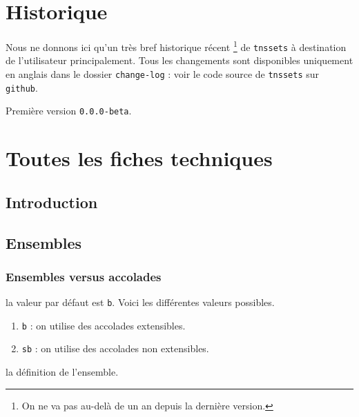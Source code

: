 \documentclass[12pt,a4paper]{article}
\theoremstyle{definition}
\begin{document}
\newpage

\section{Historique}

Nous ne donnons ici qu'un très bref historique récent
\footnote{
	On ne va pas au-delà de un an depuis la dernière version.
}
de \verb+tnssets+ à destination de l'utilisateur principalement.
Tous les changements sont disponibles uniquement en anglais dans le dossier \verb+change-log+ : voir le code source de \verb+tnssets+ sur \verb+github+.

\begin{description}

    \medskip
    \item[2020-07-10] Première version \verb+0.0.0-beta+.

\end{description}


\newpage
\section{Toutes les fiches techniques} \label{techincal-ids}

\subsection{Introduction}
\subsection{Ensembles}

\subsubsection{Ensembles versus accolades}


\IDoption{} la valeur par défaut est \verb+b+.  Voici les différentes valeurs possibles.
\begin{enumerate}
	\item \verb+b+ : on utilise des accolades extensibles.

	\item \verb+sb+ : on utilise des accolades non extensibles.
\end{enumerate}

\IDarg{} la définition de l'ensemble.
\end{document}

